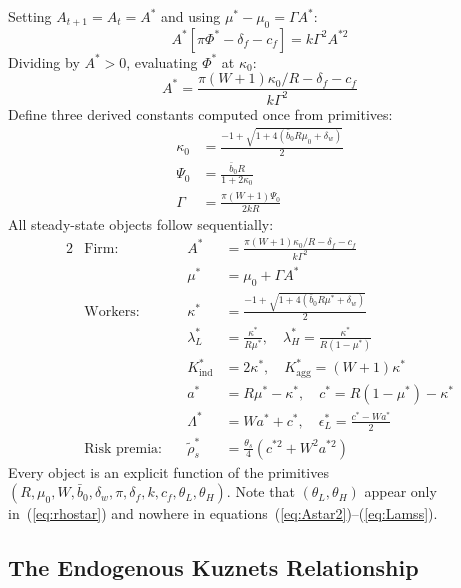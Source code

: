 \documentclass[12pt,a4paper]{article}
\begin{document}
Setting $A_{t+1} = A_t = A^*$ and using $\mu^* - \mu_0 = \Gamma A^*$:
\begin{equation}
  A^*[\pi\Phi^* - \delta_f - c_f] = k\Gamma^2 A^{*2}
  \label{eq:ss_eq}
\end{equation}
Dividing by $A^* > 0$, evaluating $\Phi^*$ at $\kappa_0$:
\begin{equation}
  \boxed{A^* = \frac{\pi(W+1)\kappa_0/R - \delta_f - c_f}{k\Gamma^2}}
  \label{eq:Astar}
\end{equation}
Define three derived constants computed once from primitives:
\begin{align}
  \kappa_0 &= \frac{-1+\sqrt{1+4(\bar{b}_0 R\mu_0+\delta_w)}}{2}
  \label{eq:k0} \\[4pt]
  \Psi_0 &= \frac{\bar{b}_0 R}{1+2\kappa_0}
  \label{eq:Psi0} \\[4pt]
  \Gamma &= \frac{\pi(W+1)\Psi_0}{2kR}
  \label{eq:Gamma}
\end{align}
All steady-state objects follow sequentially:
\begin{alignat}{2}
  &\text{Firm:}\quad
  &A^* &= \frac{\pi(W+1)\kappa_0/R - \delta_f - c_f}{k\Gamma^2}
  \label{eq:Astar2}\\[4pt]
  &&\mu^* &= \mu_0 + \Gamma A^*
  \label{eq:mustar}\\[8pt]
  &\text{Workers:}\quad
  &\kappa^* &= \frac{-1+\sqrt{1+4(\bar{b}_0 R\mu^*+\delta_w)}}{2}
  \label{eq:kstar}\\[4pt]
  &&\lambda_L^* &= \frac{\kappa^*}{R\mu^*},\quad
  \lambda_H^* = \frac{\kappa^*}{R(1-\mu^*)}
  \label{eq:lambdas}\\[4pt]
  &&K^*_{\mathrm{ind}} &= 2\kappa^*,\quad
  K^*_{\mathrm{agg}} = (W+1)\kappa^*
  \label{eq:Kss}\\[4pt]
  &&a^* &= R\mu^*-\kappa^*,\quad
  c^* = R(1-\mu^*)-\kappa^*
  \label{eq:acss}\\[4pt]
  &&\Lambda^* &= Wa^*+c^*,\quad
  \epsilon_L^* = \tfrac{c^*-Wa^*}{2}
  \label{eq:Lamss}\\[8pt]
  &\text{Risk premia:}\quad
  &\tilde\rho_s^* &= \frac{\theta_s}{4}
  \left(c^{*2} + W^2a^{*2}\right)
  \label{eq:rhostar}
\end{alignat}
Every object is an explicit function of the primitives
$(R,\mu_0,W,\bar{b}_0,\delta_w,\pi,\delta_f,k,c_f,\theta_L,\theta_H)$.
Note that $(\theta_L,\theta_H)$ appear only in~(\ref{eq:rhostar})
and nowhere in equations~(\ref{eq:Astar2})--(\ref{eq:Lamss}).

\subsection{The Endogenous Kuznets Relationship}
\end{document}
